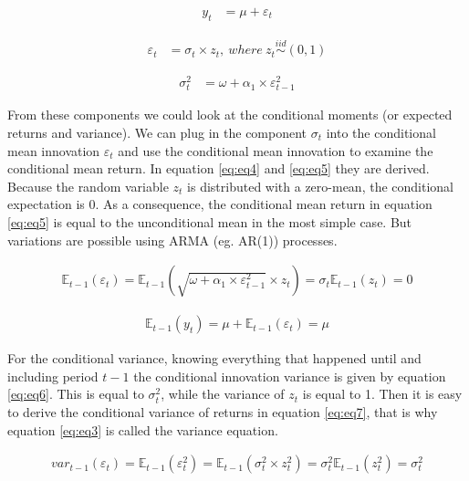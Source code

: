 \documentclass[a4paper, twoside]{templates/ociamthesis}
\begin{document}
\begin{align} 
y_{t} &= \mu + \varepsilon_t
 \label{eq:eq1}
\end{align}

\begin{align} 
\varepsilon_{t} &= \sigma_t \times z_t, \ where \ z_t \stackrel{iid}{\sim} (0,1)
 \label{eq:eq2}
\end{align} 

\begin{align} 
\sigma_{t}^{2} &= \omega + \alpha_1 \times  \varepsilon_{t-1}^2 
 \label{eq:eq3}
\end{align}

\noindent From these components we could look at the conditional moments (or expected returns and variance). We can plug in the component \(\sigma_t\) into the conditional mean innovation \(\varepsilon_{t}\) and use the conditional mean innovation to examine the conditional mean return. In equation \eqref{eq:eq4} and \eqref{eq:eq5} they are derived. Because the random variable \(z_t\) is distributed with a zero-mean, the conditional expectation is 0. As a consequence, the conditional mean return in equation \eqref{eq:eq5} is equal to the unconditional mean in the most simple case. But variations are possible using ARMA (eg. AR(1)) processes.

\begin{align} 
\mathbb{E}_{t-1}(\varepsilon_{t}) = \mathbb{E}_{t-1}(\sqrt{\omega + \alpha_1 \times  \varepsilon_{t-1}^2} \times z_t) = \sigma_t\mathbb{E}_{t-1}(z_t) = 0
 \label{eq:eq4}
\end{align} 

\begin{align} 
\mathbb{E}_{t-1}(y_{t}) = \mu + \mathbb{E}_{t-1}(\varepsilon_{t}) = \mu
 \label{eq:eq5}
\end{align}

\noindent For the conditional variance, knowing everything that happened until and including period \(t-1\) the conditional innovation variance is given by equation \eqref{eq:eq6}. This is equal to \(\sigma_t^2\), while the variance of \(z_t\) is equal to 1. Then it is easy to derive the conditional variance of returns in equation \eqref{eq:eq7}, that is why equation \eqref{eq:eq3} is called the variance equation.

\begin{align} 
var_{t-1}(\varepsilon_t) = \mathbb{E}_{t-1}(\varepsilon_{t}^2) = \mathbb{E}_{t-1}(\sigma_t^2 \times z_t^2) = \sigma_t^2\mathbb{E}_{t-1}(z_t^2) = \sigma_t^2
 \label{eq:eq6}
\end{align} 
\end{document}
